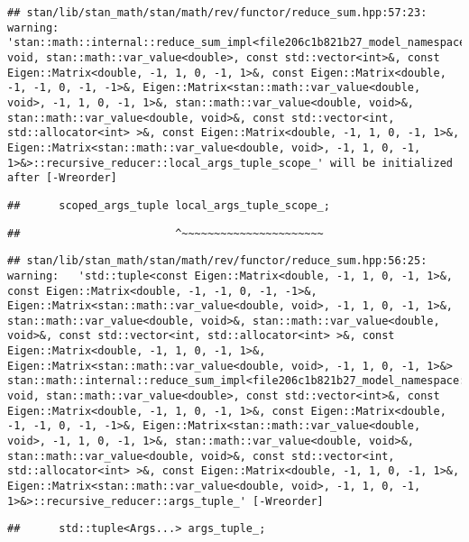 \documentclass[
]{article}
\begin{document}
\begin{verbatim}
## stan/lib/stan_math/stan/math/rev/functor/reduce_sum.hpp:57:23: warning: 'stan::math::internal::reduce_sum_impl<file206c1b821b27_model_namespace::partial_log_lik_rsfunctor__, void, stan::math::var_value<double>, const std::vector<int>&, const Eigen::Matrix<double, -1, 1, 0, -1, 1>&, const Eigen::Matrix<double, -1, -1, 0, -1, -1>&, Eigen::Matrix<stan::math::var_value<double, void>, -1, 1, 0, -1, 1>&, stan::math::var_value<double, void>&, stan::math::var_value<double, void>&, const std::vector<int, std::allocator<int> >&, const Eigen::Matrix<double, -1, 1, 0, -1, 1>&, Eigen::Matrix<stan::math::var_value<double, void>, -1, 1, 0, -1, 1>&>::recursive_reducer::local_args_tuple_scope_' will be initialized after [-Wreorder]
\end{verbatim}

\begin{verbatim}
##      scoped_args_tuple local_args_tuple_scope_;
\end{verbatim}

\begin{verbatim}
##                        ^~~~~~~~~~~~~~~~~~~~~~~
\end{verbatim}

\begin{verbatim}
## stan/lib/stan_math/stan/math/rev/functor/reduce_sum.hpp:56:25: warning:   'std::tuple<const Eigen::Matrix<double, -1, 1, 0, -1, 1>&, const Eigen::Matrix<double, -1, -1, 0, -1, -1>&, Eigen::Matrix<stan::math::var_value<double, void>, -1, 1, 0, -1, 1>&, stan::math::var_value<double, void>&, stan::math::var_value<double, void>&, const std::vector<int, std::allocator<int> >&, const Eigen::Matrix<double, -1, 1, 0, -1, 1>&, Eigen::Matrix<stan::math::var_value<double, void>, -1, 1, 0, -1, 1>&> stan::math::internal::reduce_sum_impl<file206c1b821b27_model_namespace::partial_log_lik_rsfunctor__, void, stan::math::var_value<double>, const std::vector<int>&, const Eigen::Matrix<double, -1, 1, 0, -1, 1>&, const Eigen::Matrix<double, -1, -1, 0, -1, -1>&, Eigen::Matrix<stan::math::var_value<double, void>, -1, 1, 0, -1, 1>&, stan::math::var_value<double, void>&, stan::math::var_value<double, void>&, const std::vector<int, std::allocator<int> >&, const Eigen::Matrix<double, -1, 1, 0, -1, 1>&, Eigen::Matrix<stan::math::var_value<double, void>, -1, 1, 0, -1, 1>&>::recursive_reducer::args_tuple_' [-Wreorder]
\end{verbatim}

\begin{verbatim}
##      std::tuple<Args...> args_tuple_;
\end{verbatim}
\end{document}
